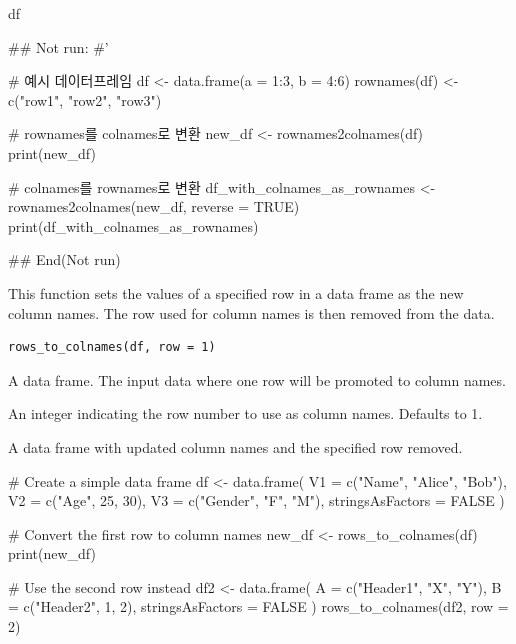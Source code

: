 \documentclass[a4paper]{book}
\begin{document}
%
\begin{Value}
df
\end{Value}
%
\begin{Examples}
\begin{ExampleCode}
## Not run: 
#'

# 예시 데이터프레임
df <- data.frame(a = 1:3, b = 4:6)
rownames(df) <- c("row1", "row2", "row3")

# rownames를 colnames로 변환
new_df <- rownames2colnames(df)
print(new_df)

# colnames를 rownames로 변환
df_with_colnames_as_rownames <- rownames2colnames(new_df, reverse = TRUE)
print(df_with_colnames_as_rownames)

## End(Not run)
\end{ExampleCode}
\end{Examples}
%
\begin{Description}
This function sets the values of a specified row in a data frame as the new column names.
The row used for column names is then removed from the data.
\end{Description}
%
\begin{Usage}
\begin{verbatim}
rows_to_colnames(df, row = 1)
\end{verbatim}
\end{Usage}
%
\begin{Arguments}
\begin{ldescription}
\item[\code{df}] A data frame. The input data where one row will be promoted to column names.

\item[\code{row}] An integer indicating the row number to use as column names. Defaults to 1.
\end{ldescription}
\end{Arguments}
%
\begin{Value}
A data frame with updated column names and the specified row removed.
\end{Value}
%
\begin{Examples}
\begin{ExampleCode}
# Create a simple data frame
df <- data.frame(
  V1 = c("Name", "Alice", "Bob"),
  V2 = c("Age", 25, 30),
  V3 = c("Gender", "F", "M"),
  stringsAsFactors = FALSE
)

# Convert the first row to column names
new_df <- rows_to_colnames(df)
print(new_df)

# Use the second row instead
df2 <- data.frame(
  A = c("Header1", "X", "Y"),
  B = c("Header2", 1, 2),
  stringsAsFactors = FALSE
)
rows_to_colnames(df2, row = 2)
\end{ExampleCode}
\end{Examples}
\end{document}
